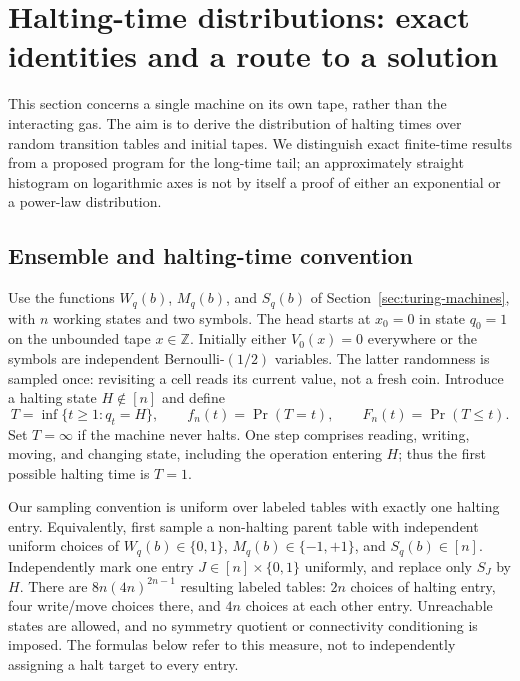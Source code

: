 \documentclass{article}
\begin{document}
\clearpage
\section{Halting-time distributions: exact identities and a route to a solution}
\label{sec:halting-distribution}

This section concerns a single machine on its own tape, rather than the
interacting gas.  The aim is to derive the distribution of halting times
over random transition tables and initial tapes.  We distinguish exact
finite-time results from a proposed program for the long-time tail; an
approximately straight histogram on logarithmic axes is not by itself a
proof of either an exponential or a power-law distribution.

\subsection{Ensemble and halting-time convention}

Use the functions $W_q(b)$, $M_q(b)$, and $S_q(b)$ of
Section~\ref{sec:turing-machines}, with $n$ working states and two symbols.
The head starts at $x_0=0$ in state $q_0=1$ on the unbounded tape
$x\in\mathbb Z$.  Initially either $V_0(x)=0$ everywhere or the symbols
are independent Bernoulli-$(1/2)$ variables.  The latter randomness is
sampled once: revisiting a cell reads its current value, not a fresh coin.
Introduce a halting state $H\notin[n]$ and define
\begin{equation}
T=\inf\{t\geq1:q_t=H\},\qquad
f_n(t)=\Pr(T=t),\qquad F_n(t)=\Pr(T\leq t).
\end{equation}
Set $T=\infty$ if the machine never halts.  One step comprises reading,
writing, moving, and changing state, including the operation entering
$H$; thus the first possible halting time is $T=1$.

Our sampling convention is uniform over labeled tables with exactly one
halting entry.  Equivalently, first sample a non-halting parent table with
independent uniform choices of $W_q(b)\in\{0,1\}$,
$M_q(b)\in\{-1,+1\}$, and $S_q(b)\in[n]$.  Independently mark one
entry $J\in[n]\times\{0,1\}$ uniformly, and replace only $S_J$ by $H$.
There are $8n(4n)^{2n-1}$ resulting labeled tables: $2n$ choices of
halting entry, four write/move choices there, and $4n$ choices at each
other entry.  Unreachable states are allowed, and no symmetry quotient
or connectivity conditioning is imposed.  The formulas below refer to
this measure, not to independently assigning a halt target to every entry.
\end{document}
